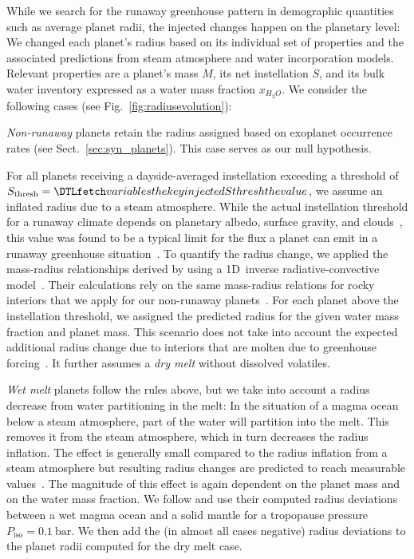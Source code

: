 \documentclass[twocolumn,twocolappendix]{aastex631}
\begin{document}
While we search for the runaway greenhouse pattern in demographic quantities such as average planet radii, the injected changes happen on the planetary level: We changed each planet's radius based on its individual set of properties and the associated predictions from steam atmosphere and water incorporation models.
Relevant properties are a planet's mass $M$, its net instellation $S$, and its bulk water inventory expressed as a water mass fraction $x_{H_2O}$.
We consider the following cases (see Fig.~\ref{fig:radiusevolution}):

\textit{Non-runaway} planets retain the radius assigned based on exoplanet occurrence rates (see Sect.~\ref{sec:syn_planets}).
This case serves as our null hypothesis.

For all planets receiving a dayside-averaged instellation exceeding a threshold of $S_\mathrm{thresh} = \var{injectedSthresh}$, we assume an inflated radius due to a steam atmosphere.
While the actual instellation threshold for a runaway climate depends on planetary albedo, surface gravity, and clouds~\citep{Pierrehumbert2022}, this value was found to be a typical limit for the flux a planet can emit in a runaway greenhouse situation~\citep{Abe1988,Kasting1988,Nakajima1992,Goldblatt2013,Leconte2013,Boukrouche2021}.
To quantify the radius change, we applied the mass-radius relationships derived by \citet{Turbet2020} using a 1D~inverse radiative-convective model~\citep{Turbet2019}.
Their calculations rely on the same mass-radius relations for rocky interiors that we apply for our non-runaway planets~\citep{Zeng2016}.
For each planet above the instellation threshold, we assigned the predicted radius for the given water mass fraction and planet mass.
This scenario does not take into account the expected additional radius change due to interiors that are molten due to greenhouse forcing~\citep{Bower2019}.
It further assumes a \textit{dry melt} without dissolved volatiles.

\textit{Wet melt} planets follow the rules above, but we take into account a radius decrease from water partitioning in the melt:
In the situation of a magma ocean below a steam atmosphere, part of the water will partition into the melt.
This removes it from the steam atmosphere, which in turn decreases the radius inflation.
The effect is generally small compared to the radius inflation from a steam atmosphere but resulting radius changes are predicted to reach measurable values~\citep{Dorn2021}.
The magnitude of this effect is again dependent on the planet mass and on the water mass fraction.
We follow \citet{Dorn2021} and use their computed radius deviations between a wet magma ocean and a solid mantle for a tropopause pressure~$P_\mathrm{iso}=\SI{0.1}{\bar}$.
We then add the (in almost all cases negative) radius deviations to the planet radii computed for the dry melt case.
\end{document}
